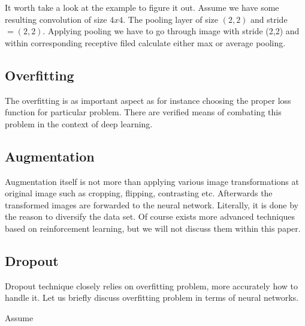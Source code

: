 It worth take a look at the example to figure it out. Assume we have some resulting convolution of size $4x4$. The pooling layer of size $(2, 2)$ and stride $ = (2, 2)$. 
Applying pooling we have to go through image with stride (2,2) and within corresponding receptive filed calculate either max or average pooling.  

\subsection{Overfitting}
The overfitting is as important aspect as for instance choosing the proper loss function for particular problem. There are verified means of combating this problem in the context of deep learning.   

\subsection{Augmentation}
Augmentation itself is not more than applying various image transformations at original image such as cropping, flipping, contrasting etc. Afterwards the transformed images are forwarded to the neural network. Literally, it is done by the reason to diversify the data set. Of course exists more advanced techniques based on reinforcement learning, but we will not discuss them within this paper.      

\subsection{Dropout}
Dropout technique closely relies on overfitting problem, more accurately how to handle it. Let us briefly discuss overfitting problem in terms of neural networks.

Assume 



